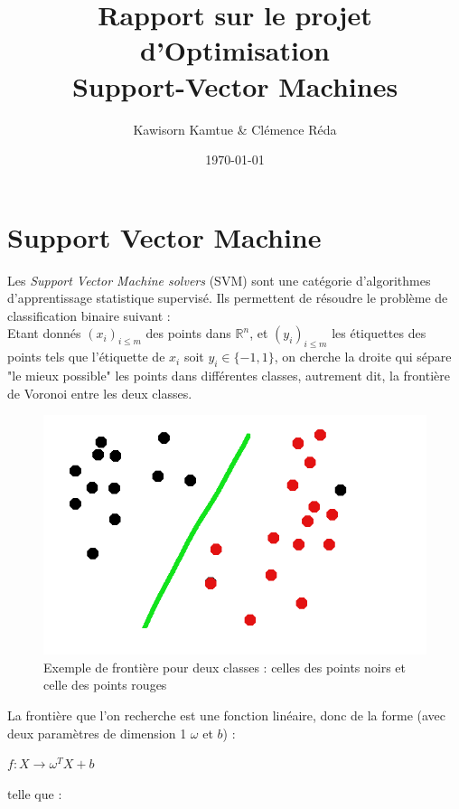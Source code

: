 \documentclass{article}
\title{Rapport sur le projet d'Optimisation\\Support-Vector Machines}
\author{Kawisorn Kamtue \& Clémence Réda}
\date{\today}
\begin{document}
\section{Support Vector Machine}

Les \emph{Support Vector Machine solvers} (SVM) sont une catégorie d'algorithmes d'apprentissage statistique supervisé. Ils permettent de résoudre le problème de classification binaire suivant :\\

           
           Etant donnés $(x_i)_{i \leq m}$ des points dans $\mathbb{R}^n$, et $(y_i)_{i \leq m}$ les étiquettes des points tels que l'étiquette de $x_i$ soit $y_i \in \{-1, 1\}$, on cherche la droite qui sépare "le mieux possible" les points dans différentes classes, autrement dit, la frontière de Voronoi entre les deux classes.
           \begin{center}
           \begin{figure}[H]
           \centering
           \caption{Exemple de frontière pour deux classes : celles des points noirs et celle des points rouges}
           \includegraphics[scale=0.3]{images/voronoi.png}
           \end{figure}
           \end{center} 

\noidnent La frontière que l'on recherche est une fonction linéaire, donc de la forme (avec deux paramètres de dimension 1 $\omega$ et $b$) :\\

          \begin{center}
          $f : X \rightarrow \omega^{T}X + b$
          \end{center}

telle que :\\
 
\end{document}
